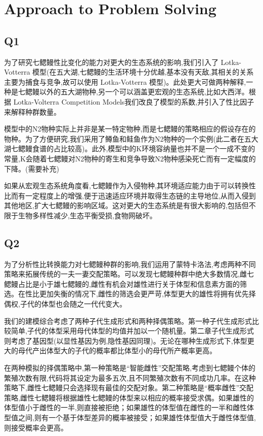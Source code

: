 \documentclass[12pt]{article}
\begin{document}
\section{Approach to Problem Solving}
\subsection{Q1}
为了研究七鳃鳗性比变化的能力对更大的生态系统的影响,我们引入了 Lotka-Votterra 模型(在五大湖,七鳃鳗的生活环境十分优越,基本没有天敌,其相关的关系主要为捕食与竞争,故可以使用 Lotka-Votterra 模型)。此处更大可做两种解释,一种是七鳃鳗以外的五大湖物种,另一个可以涵盖更宏观的生态系统,比如大西洋。根据 Lotka-Volterra Competition Models我们改良了模型的系数,并引入了性比因子来解释种群数量。 

       模型中的N2物种实际上并非是某一特定物种,而是七鳃鳗的策略相应的假设存在的物种。为了方便研究,我们采用了鳟鱼和鲑鱼作为N2物种的一个实例(此二者在五大湖七鳃鳗食谱的占比较高)。此外,模型中的K环境容纳量也并不是一个一成不变的常量,K会随着七鳃鳗对N2物种的寄生和竞争导致N2物种感染死亡而有一定幅度的下降。(需要补充) 

       如果从宏观生态系统角度看,七鳃鳗作为入侵物种,其环境适应能力由于可以转换性比而有一定程度上的增强,便于迅速适应环境并取得生态链的主导地位,从而入侵到其他地区,扩大七鳃鳗的影响区域。这对更大的生态系统是有很大影响的,包括但不限于生物多样性减少,生态平衡受损,食物网破坏。 
\subsection{Q2}
为了分析性比转换能力对七鳃鳗种群的影响,我们运用了蒙特卡洛法,考虑两种不同策略来拓展传统的一夫一妻交配策略。可以发现七鳃鳗种群中绝大多数情况,雌七鳃鳗占比是小于雄七鳃鳗的,雌性有机会对雄性进行关于体型和信息素方面的筛选。在性比更加失衡的情况下,雌性的筛选会更严苛,体型更大的雄性将拥有优先择偶权,子代的体型也会随之一代代变大。 

       我们的建模综合考虑了两种子代生成形式和两种择偶策略。第一种子代生成形式比较简单,子代的体型采用母代体型的均值并加以一个随机量。第二章子代生成形式则考虑了基因型(以显性基因为例,隐性基因同理)。无论在哪种生成形式下,体型更大的母代产出体型大的子代的概率都比体型小的母代所产概率更高。 

       在两种模拟的择偶策略中,第一种策略是“智能雌性”交配策略,考虑到七鳃鳗个体的繁殖次数有限,代码将其设定为最多五次,且不同繁殖次数有不同成功几率。在这种策略下,雌性七鳃鳗只会选择现有最佳的交配对象。第二种策略是“概率雌性”交配策略,雌性七鳃鳗将根据雄性七鳃鳗的体型来以相应的概率接受求偶。如果雄性的体型值小于雌性的一半,则直接被拒绝；如果雄性的体型值在雌性的一半和雌性体型值之间,则有一个基于体型差异的概率被接受；如果雄性体型值大于雌性体型值,则接受概率会更高。 
\end{document}
